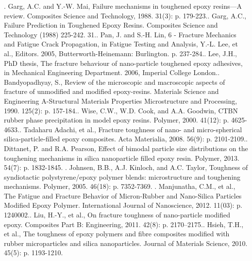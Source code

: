 \documentclass[numbers=noendperiod,chapterprefix=on]{icldt} %
\begin{document}
.	Garg, A.C. and Y.-W. Mai, Failure mechanisms in toughened epoxy resins—A review. Composites Science and Technology, 1988. 31(3): p. 179-223..	Garg, A.C., Failure Prediction in Toughened Epoxy Resins. Composites Science and Technology (1988) 225-242. 31..	Pan, J. and S.-H. Lin, 6 - Fracture Mechanics and Fatigue Crack Propagation, in Fatigue Testing and Analysis, Y.-L. Lee, et al., Editors. 2005, Butterworth-Heinemann: Burlington. p. 237-284..	Lee, J.H., PhD thesis, The fracture behaviour of nano-particle toughened epoxy adhesives, in Mechanical Engineering Department. 2006, Imperial College London..	Bandyopadhyay, S., Review of the microscopic and macroscopic aspects of fracture of unmodified and modified epoxy-resins. Materials Science and Engineering A-Structural Materials Properties Microstructure and Processing, 1990. 125(2): p. 157-184..	Wise, C.W., W.D. Cook, and A.A. Goodwin, CTBN rubber phase precipitation in model epoxy resins. Polymer, 2000. 41(12): p. 4625-4633..	Tadaharu Adachi, et al., Fracture toughness of nano- and micro-spherical silica-particle-filled epoxy composites. Acta Materialia, 2008. 56(9): p. 2101-2109..	Dittanet, P. and R.A. Pearson, Effect of bimodal particle size distributions on the toughening mechanisms in silica nanoparticle filled epoxy resin. Polymer, 2013. 54(7): p. 1832-1845.
.	Johnsen, B.B., A.J. Kinloch, and A.C. Taylor, Toughness of syndiotactic polystyrene/epoxy polymer blends: microstructure and toughening mechanisms. Polymer, 2005. 46(18): p. 7352-7369.
.	Manjunatha, C.M., et al., The Fatigue and Fracture Behavior of Micron-Rubber and Nano-Silica Particles Modified Epoxy Polymer. International Journal of Nanoscience, 2012. 11(03): p. 1240002..	Liu, H.-Y., et al., On fracture toughness of nano-particle modified epoxy. Composites Part B: Engineering, 2011. 42(8): p. 2170–2175..	Hsieh, T.H., et al., The toughness of epoxy polymers and fibre composites modified with rubber microparticles and silica nanoparticles. Journal of Materials Science, 2010. 45(5): p. 1193-1210.\newline
\end{document}
